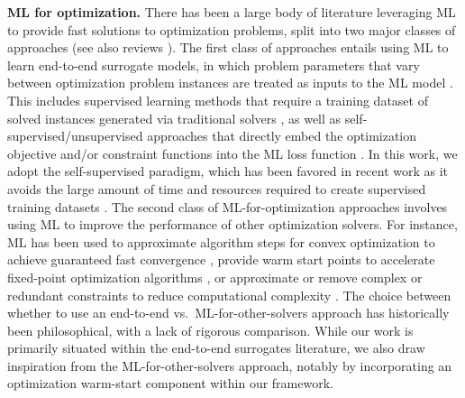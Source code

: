 \documentclass{article}
\begin{document}
\textbf{ML for optimization.} There has been a large body of literature leveraging ML to provide fast solutions to optimization problems, split into two major classes of approaches (see also reviews \cite{khaloie2025review, bengio2020machine, hasan2020survey}).
The first class of approaches entails using ML to learn end-to-end surrogate models,
in which problem parameters that vary between optimization problem instances are treated as inputs to the ML model \cite{van2025optimization, amos2023tutorial}.
This includes supervised learning methods that require a training dataset of solved instances generated via traditional solvers \cite{chen2022learning, zamzam2020learning, fioretto2021lagrangian}, as well as self-supervised/unsupervised approaches that directly embed the optimization objective and/or constraint functions into the ML loss function \cite{donti2021dc3, tanneau2024dual, park2023compact, amos2017optnet}.
In this work, we adopt the self-supervised paradigm, which has been favored in recent work as it avoids the large amount of time and resources required to create supervised training datasets \cite{thams2019efficient}.
The second class of ML-for-optimization approaches involves using ML to improve the performance of other optimization solvers.
For instance, ML has been used to
approximate algorithm steps for convex optimization to achieve guaranteed fast convergence \cite{tan2023data}, provide warm start points to accelerate fixed-point optimization algorithms \cite{sambharya2024learning}, or approximate or remove complex or redundant constraints to reduce computational complexity \cite{bertsimas2025global, misra2022learning}.
The choice between whether to use an 
end-to-end vs.~ML-for-other-solvers approach
has historically been philosophical, with a lack of rigorous comparison. %
While our work is primarily situated within the end-to-end surrogates literature, we also draw inspiration from the ML-for-other-solvers approach, notably by incorporating an optimization warm-start component within our framework.
\end{document}
